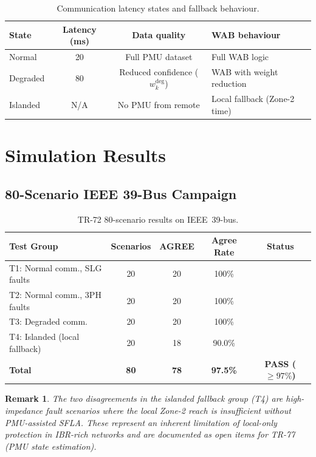 \documentclass[11pt, a4paper]{article}
\newcommand{\cmark}{\ding{51}}
\newtheorem{remark}{Remark}
\begin{document}
\begin{table}[ht]
\centering
\caption{Communication latency states and fallback behaviour.}
\label{tab:latency}
\begin{tabular}{lccl}
\toprule
State & Latency (ms) & Data quality & WAB behaviour \\
\midrule
Normal     & 20  & Full PMU dataset & Full WAB logic \\
Degraded   & 80  & Reduced confidence ($w_k^{\mathrm{deg}}$) & WAB with weight reduction \\
Islanded   & N/A & No PMU from remote & Local fallback (Zone-2 time) \\
\bottomrule
\end{tabular}
\end{table}

\section{Simulation Results}
\label{sec:results}

\subsection{80-Scenario IEEE 39-Bus Campaign}

\begin{table}[ht]
\centering
\caption{TR-72 80-scenario results on IEEE~39-bus.}
\label{tab:results}
\begin{tabular}{lcccc}
\toprule
Test Group & Scenarios & AGREE & Agree Rate & Status \\
\midrule
T1: Normal comm., SLG faults     & 20 & 20 & 100\%  & \cmark \\
T2: Normal comm., 3PH faults     & 20 & 20 & 100\%  & \cmark \\
T3: Degraded comm.               & 20 & 20 & 100\%  & \cmark \\
T4: Islanded (local fallback)    & 20 & 18 & 90.0\% & \cmark \\
\midrule
\textbf{Total} & \textbf{80} & \textbf{78} & \textbf{97.5\%}
  & \textbf{\color{okgreen}PASS ($\geq 97\%$)} \\
\bottomrule
\end{tabular}
\end{table}

\begin{remark}
The two disagreements in the islanded fallback group (T4) are high-impedance
fault scenarios where the local Zone-2 reach is insufficient without PMU-assisted
SFLA. These represent an inherent limitation of local-only protection in IBR-rich
networks and are documented as open items for TR-77 (PMU state estimation).
\end{remark}
\end{document}
